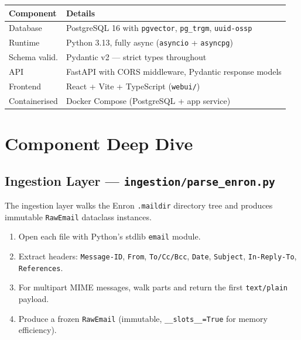 \documentclass[11pt,a4paper]{article}
\newcommand{\code}[1]{\texttt{\small#1}}
\begin{document}
\begin{table}[H]
\centering
\small
\begin{tabularx}{\linewidth}{L{3.2cm} X}
\toprule
{}
\color{white}\textbf{Component} & \color{white}\textbf{Details} \\
\midrule
Database       & PostgreSQL 16 with \code{pgvector}, \code{pg\_trgm}, \code{uuid-ossp} \\
Runtime        & Python 3.13, fully async (\code{asyncio} + \code{asyncpg}) \\
Schema valid.  & Pydantic v2 — strict types throughout \\
API            & FastAPI with CORS middleware, Pydantic response models \\
Frontend       & React + Vite + TypeScript (\code{webui/}) \\
Containerised  & Docker Compose (PostgreSQL + app service) \\
\bottomrule
\end{tabularx}
\end{table}

\section{Component Deep Dive}

\subsection{Ingestion Layer — \code{ingestion/parse\_enron.py}}

The ingestion layer walks the Enron \texttt{.maildir} directory tree and produces
immutable \code{RawEmail} dataclass instances.

\begin{enumerate}[leftmargin=*, itemsep=2pt]
  \item Open each file with Python's stdlib \code{email} module.
  \item Extract headers: \code{Message-ID}, \code{From}, \code{To/Cc/Bcc},
        \code{Date}, \code{Subject}, \code{In-Reply-To}, \code{References}.
  \item For multipart MIME messages, walk parts and return the first
        \code{text/plain} payload.
  \item Produce a frozen \code{RawEmail} (immutable, \code{\_\_slots\_\_=True}
        for memory efficiency).
\end{enumerate}
\end{document}
